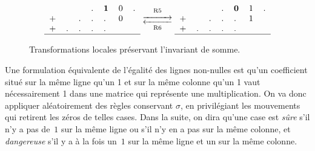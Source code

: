 \documentclass[11pt, openany, a4paper]{article}
\newcommand{\myrightleftarrows}[1]{\mathrel{\substack{\xrightarrow{#1} \\[-.6ex] \xleftarrow{#1}}}}
\newcommand{\longrightleftarrows}{\myrightleftarrows{\rule{1cm}{0cm}}}
\begin{document}
\begin{figure}[hbt]
{\begin{minipage}{0.6\textwidth}
\[
\begin{tabular}{lllllll}
&&&.&\textbf 1&0&. \\
+&&.&.&.&0&\\
+&.&.&.&.&&\\
\hline
\end{tabular}
\mathrel{\mathop{\longrightleftarrows}^{\mathrm{R5}}_{\mathrm{R6}}}
\begin{tabular}{lllllll}
&&&.&\textbf 0&1&. \\
+&&.&.&.&1&\\
+&.&.&.&.&&\\
\hline
\end{tabular}
\]
\end{minipage}}

\caption{Transformations locales préservant l'invariant de somme.}

\label{fig:rules}

\end{figure}




Une formulation équivalente de l'égalité des lignes non-nulles est qu'un coefficient situé sur la même ligne qu'un 1 et sur la même colonne qu'un 1 vaut nécessairement 1 dans une matrice qui représente une multiplication. On va donc appliquer aléatoirement des règles conservant $\sigma$, en privilégiant les mouvements qui retirent les zéros de telles cases. Dans la suite, on dira qu'une case est \emph{sûre} s'il n'y a pas de~$1$ sur la même ligne ou s'il n'y en a pas sur la même colonne, et \emph{dangereuse} s'il y a à la fois un~$1$ sur la même ligne et un sur la même colonne.
\end{document}
